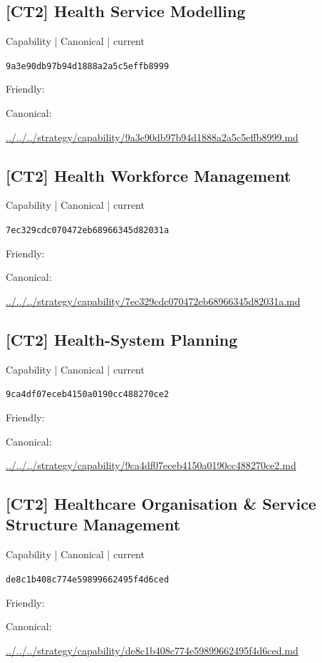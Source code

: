 \documentclass[10pt,a4paper]{article}
\begin{document}
\subsection*{[CT2] Health Service Modelling}
{\small Capability | Canonical | current}\par
\texttt{9a3e90db97b94d1888a2a5c5effb8999}\par
Friendly: \par
Canonical: \par
{\footnotesize\url{../../../strategy/capability/9a3e90db97b94d1888a2a5c5effb8999.md}}\par
\subsection*{[CT2] Health Workforce Management}
{\small Capability | Canonical | current}\par
\texttt{7ec329cdc070472eb68966345d82031a}\par
Friendly: \par
Canonical: \par
{\footnotesize\url{../../../strategy/capability/7ec329cdc070472eb68966345d82031a.md}}\par
\subsection*{[CT2] Health-System Planning}
{\small Capability | Canonical | current}\par
\texttt{9ca4df07eceb4150a0190cc488270ce2}\par
Friendly: \par
Canonical: \par
{\footnotesize\url{../../../strategy/capability/9ca4df07eceb4150a0190cc488270ce2.md}}\par
\subsection*{[CT2] Healthcare Organisation \& Service Structure Management}
{\small Capability | Canonical | current}\par
\texttt{de8c1b408c774e59899662495f4d6ced}\par
Friendly: \par
Canonical: \par
{\footnotesize\url{../../../strategy/capability/de8c1b408c774e59899662495f4d6ced.md}}\par
\end{document}
